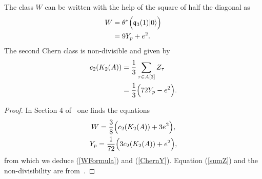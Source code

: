 \begin{proposition}
The class $W$ can be written with the help of the square of half the diagonal as
\begin{align} 
W &= \theta^*\Big( \mathfrak{q}_3(1)|0\rangle \Big) \\
\label{WFormula}
&= 9 Y_p + e^2.
\end{align}
The second Chern class is non-divisible and given by 
\begin{align}
\label{sumZ}
c_2(K_{ 2 }( A )) &= \frac{1}{3}\sum_{\tau\in A[3] } Z_\tau \\
\label{ChernY}
&= \frac{1}{3} \Big(72Y_p-e^2 \Big). 
\end{align}
\end{proposition}
\begin{proof} 
In Section 4 of~\cite{Hassett} one finds the equations
\begin{gather}
W = \frac{3}{8}\Big(c_2(K_{ 2 }( A )) + 3e^2\Big),\label{WW} \\
Y_p = \frac{1}{72}\Big(3c_2(K_{ 2 }( A )) + e^2\Big),
\end{gather}
from which we deduce (\ref{WFormula}) and (\ref{ChernY}).
Equation (\ref{sumZ}) and the non-divisibility are from~\cite[Proposition 5.1]{Hassett}.
\end{proof}

